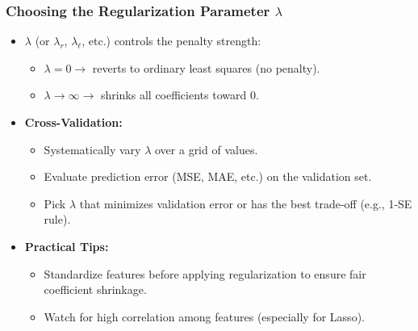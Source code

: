 \documentclass[aspectratio=169]{beamer}
\begin{document}
\begin{frame}
    \frametitle{Choosing the Regularization Parameter \(\lambda\)}
    \begin{itemize}
        \item \(\lambda\) (or \(\lambda_r\), \(\lambda_\ell\), etc.) controls the penalty strength:
        \begin{itemize}
            \item \(\lambda = 0 \rightarrow\) reverts to ordinary least squares (no penalty).
            \item \(\lambda \rightarrow \infty \rightarrow\) shrinks all coefficients toward 0.
        \end{itemize}
        \item \textbf{Cross-Validation:} 
        \begin{itemize}
            \item Systematically vary \(\lambda\) over a grid of values.
            \item Evaluate prediction error (MSE, MAE, etc.) on the validation set.
            \item Pick \(\lambda\) that minimizes validation error or has the best trade-off (e.g., 1-SE rule).
        \end{itemize}
        \item \textbf{Practical Tips:}
        \begin{itemize}
            \item Standardize features before applying regularization to ensure fair coefficient shrinkage.
            \item Watch for high correlation among features (especially for Lasso).
        \end{itemize}
    \end{itemize}
\end{frame}
\end{document}
